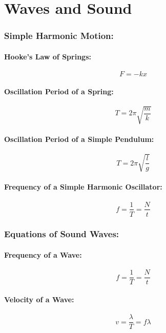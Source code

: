 \documentclass[a4paper]{report}
\begin{document}
\addtocounter{chapter}{1}
\chapter{Waves and Sound}
    \subsection{Simple Harmonic Motion:}
        \subsubsection{Hooke's Law of Springs:}
            \begin{equation}
                F = -kx
            \end{equation}
        \subsubsection{Oscillation Period of a Spring:}
            \begin{equation}
                T = 2 \pi \sqrt{\frac{m}{k}}
            \end{equation}
        \subsubsection{Oscillation Period of a Simple Pendulum:}
            \begin{equation}
                T = 2 \pi \sqrt{\frac{l}{g}}
            \end{equation}
        \subsubsection{Frequency of a Simple Harmonic Oscillator:}
            \begin{equation}
                f = \frac{1}{T} = \frac{N}{t}
            \end{equation}
    \subsection{Equations of Sound Waves:}
        \subsubsection{Frequency of a Wave: }
            \begin{equation}
                f = \frac{1}{T} = \frac{N}{t}
            \end{equation}
        \subsubsection{Velocity of a Wave: }
            \begin{equation}
                v = \frac{\lambda}{T} = f \lambda
            \end{equation}
\end{document}
